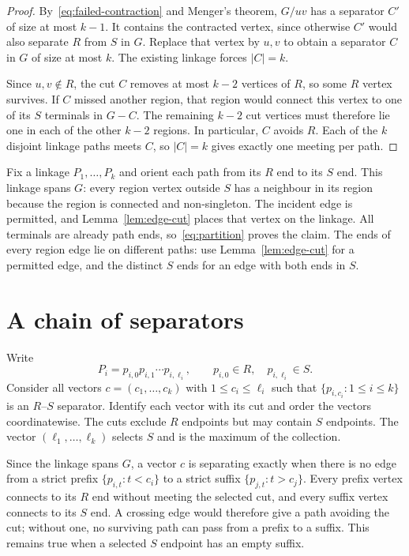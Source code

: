 \documentclass[11pt]{amsart}
\begin{document}
\begin{proof}
By~\eqref{eq:failed-contraction} and Menger's theorem, $G/uv$ has a
separator $C'$ of size at most $k-1$. It contains the contracted
vertex, since otherwise $C'$ would also separate $R$ from $S$ in $G$.
Replace that vertex by $u,v$ to obtain a separator $C$ in $G$ of size
at most $k$. The existing linkage forces $|C|=k$.

Since $u,v\notin R$, the cut $C$ removes at most $k-2$ vertices of
$R$, so some $R$ vertex survives. If $C$ missed another region, that
region would connect this vertex to one of its $S$ terminals in $G-C$.
The remaining $k-2$ cut vertices must therefore lie one in each of
the other $k-2$ regions. In particular, $C$ avoids $R$. Each of the
$k$ disjoint linkage paths meets $C$, so $|C|=k$ gives exactly one
meeting per path.
\end{proof}

Fix a linkage $P_1,\ldots,P_k$ and orient each path from its $R$ end
to its $S$ end. This linkage spans $G$: every region vertex outside $S$
has a neighbour in its region because the region is connected and
non-singleton. The incident edge is permitted, and
Lemma~\ref{lem:edge-cut} places that vertex on the linkage. All
terminals are already path ends, so~\eqref{eq:partition} proves the
claim. The ends of every region edge lie on different paths:
use Lemma~\ref{lem:edge-cut} for a permitted edge, and the distinct
$S$ ends for an edge with both ends in $S$.

\section{A chain of separators}\label{sec:chain}

Write
\[
 P_i=p_{i,0}p_{i,1}\cdots p_{i,\ell_i},\qquad
 p_{i,0}\in R,\quad p_{i,\ell_i}\in S.
\]
Consider all vectors $c=(c_1,\ldots,c_k)$ with
$1\leq c_i\leq\ell_i$ such that
$\{p_{i,c_i}:1\leq i\leq k\}$ is an $R$--$S$ separator.
Identify each vector with its cut and order the vectors coordinatewise.
The cuts exclude $R$ endpoints but may contain $S$ endpoints. The vector
$(\ell_1,\ldots,\ell_k)$ selects $S$ and is the maximum of the collection.

Since the linkage spans $G$, a vector $c$ is separating exactly when
there is no edge from a strict prefix
$\{p_{i,t}:t<c_i\}$ to a strict suffix
$\{p_{j,t}:t>c_j\}$. Every prefix vertex connects to its $R$ end
without meeting the selected cut, and every suffix vertex connects to
its $S$ end. A crossing edge would therefore give a path avoiding the
cut; without one, no surviving path can pass from a prefix to a suffix.
This remains true when a selected $S$ endpoint has an empty suffix.
\end{document}
